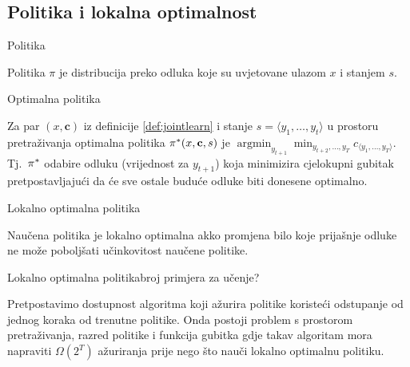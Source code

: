 \documentclass{beamer}
\makeatletter
\def\@fnsymbol#1{\ensuremath{\ifcase#1\or *\or \dagger\or \ddagger\or
   \mathsection\or \mathparagraph\or \|\or **\or \dagger\dagger
   \or \ddagger\ddagger \else\@ctrerr\fi}}
\newcommand{\ssymbol}[1]{^{\@fnsymbol{#1}}}
\DeclareMathOperator*{\argmin}{argmin}
\makeatother
\begin{document}
\subsection{Politika i lokalna optimalnost}
\begin{frame}{Politika}
  \begin{definition}
    Politika $\pi$ je distribucija preko odluka koje su uvjetovane ulazom $x$ i
    stanjem $s$.
  \end{definition}
\end{frame}

\begin{frame}{Optimalna politika}
  \begin{definition}

    Za par $(x, \mathbf{c})$ iz definicije \ref{def:jointlearn} i stanje $s =
    \langle y_1, \ldots, y_t \rangle$ u prostoru pretraživanja optimalna
    politika $\pi\ssymbol{1}(x, \mathbf{c}, s)$ je $\argmin_{y_{t+1}}
    \min_{y_{t+2}, \ldots, y_T} c_{\langle y_1, \ldots, y_T \rangle}$.
    Tj.~$\pi\ssymbol{1}$ odabire odluku (vrijednost za $y_{t+1}$) koja
    minimizira cjelokupni gubitak pretpostavljajući da će sve ostale buduće
    odluke biti donesene optimalno.

  \end{definition}
\end{frame}

\begin{frame}{Lokalno optimalna politika}
  \begin{definition}

    Naučena politika je lokalno optimalna akko promjena bilo koje prijašnje
    odluke ne može poboljšati učinkovitost naučene politike.

  \end{definition}
\end{frame}

\begin{frame}{Lokalno optimalna politika}{broj primjera za učenje?}
  \begin{theorem} \label{th:localopt}

    Pretpostavimo dostupnost algoritma koji ažurira politike koristeći odstupanje
    od jednog koraka od trenutne politike. Onda postoji problem s prostorom
    pretraživanja, razred politike i funkcija gubitka gdje takav algoritam mora
    napraviti $\Omega(2^T)$ ažuriranja prije nego što nauči lokalno optimalnu
    politiku.

  \end{theorem}
\end{frame}
\end{document}
